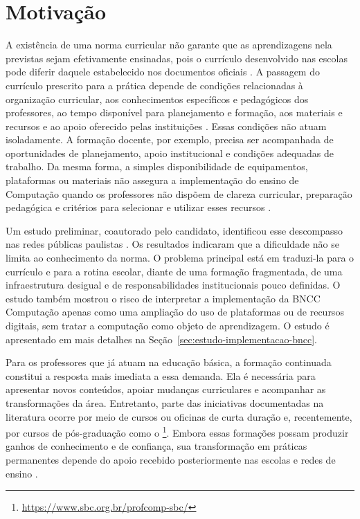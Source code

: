 \section{Motivação}
\label{sec:motivacao}

A existência de uma norma curricular não garante que as aprendizagens nela previstas sejam efetivamente ensinadas, pois o currículo desenvolvido nas escolas pode diferir daquele estabelecido nos documentos oficiais \cite{remillard2014conceptualizing}. A passagem do currículo prescrito para a prática depende de condições relacionadas à organização curricular, aos conhecimentos específicos e pedagógicos dos professores, ao tempo disponível para planejamento e formação, aos materiais e recursos e ao apoio oferecido pelas instituições \cite{yiatas2026enacting,royal2017afterreboot}. Essas condições não atuam isoladamente. A formação docente, por exemplo, precisa ser acompanhada de oportunidades de planejamento, apoio institucional e condições adequadas de trabalho. Da mesma forma, a simples disponibilidade de equipamentos, plataformas ou materiais não assegura a implementação do ensino de Computação quando os professores não dispõem de clareza curricular, preparação pedagógica e critérios para selecionar e utilizar esses recursos \cite{royal2017afterreboot}.

Um estudo preliminar, coautorado pelo candidato, identificou esse descompasso nas redes públicas paulistas \cite{santana2026desafios}. Os resultados indicaram que a dificuldade não se limita ao conhecimento da norma. O problema principal está em traduzi-la para o currículo e para a rotina escolar, diante de uma formação fragmentada, de uma infraestrutura desigual e de responsabilidades institucionais pouco definidas. O estudo também mostrou o risco de interpretar a implementação da BNCC Computação apenas como uma ampliação do uso de plataformas ou de recursos digitais, sem tratar a computação como objeto de aprendizagem. O estudo é apresentado em mais detalhes na Seção~\ref{sec:estudo-implementacao-bncc}.

Para os professores que já atuam na educação básica, a formação continuada constitui a resposta mais imediata a essa demanda. Ela é necessária para apresentar novos conteúdos, apoiar mudanças curriculares e acompanhar as transformações da área. Entretanto, parte das iniciativas documentadas na literatura ocorre por meio de cursos ou oficinas de curta duração e, recentemente, por cursos de pós-graduação como o  \footnote{\url{https://www.sbc.org.br/profcomp-sbc/}}. Embora essas formações possam produzir ganhos de conhecimento e de confiança, sua transformação em práticas permanentes depende do apoio recebido posteriormente nas escolas e redes de ensino \cite{liu2024bringing,ma2025effectiveness,mouza2022investigating}.

